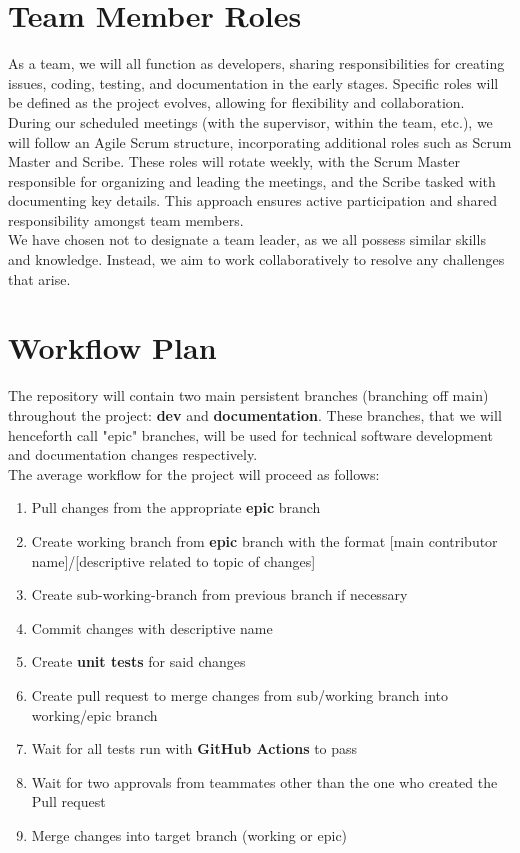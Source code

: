 \documentclass{article}
\begin{document}
\section{Team Member Roles}

\hspace{\parindent}As a team, we will all function as developers,
sharing responsibilities
for creating issues, coding, testing, and documentation in the early
stages. Specific roles
will be defined as the project evolves, allowing for flexibility and
collaboration. \\

During our scheduled meetings (with the supervisor, within the team,
etc.), we will follow
an Agile Scrum structure, incorporating additional roles such as
Scrum Master and Scribe.
These roles will rotate weekly, with the Scrum Master responsible for
organizing and leading
the meetings, and the Scribe tasked with documenting key details.
This approach ensures active
participation and shared responsibility amongst team members. \\

We have chosen not to designate a team leader, as we all possess
similar skills and knowledge.
Instead, we aim to work collaboratively to resolve any challenges that arise.

\section{Workflow Plan}

\hspace{\parindent}The repository will contain two main persistent
branches (branching off main) throughout the project:
\textbf{dev} and \textbf{documentation}. These branches, that we will
henceforth call "epic" branches, will be used for technical
software development and documentation changes respectively. \\

The average workflow for the project will proceed as follows:
\begin{enumerate}
  \item Pull changes from the appropriate \textbf{epic} branch
  \item Create working branch from \textbf{epic} branch with the
    format [main contributor name]/[descriptive related to topic of changes]
  \item Create sub-working-branch from previous branch if necessary
  \item Commit changes with descriptive name
  \item Create \textbf{unit tests} for said changes
  \item Create pull request to merge changes from sub/working branch
    into working/epic branch
  \item Wait for all tests run with \textbf{GitHub Actions} to pass
  \item Wait for two approvals from teammates other than the one who
    created the Pull request
  \item Merge changes into target branch (working or epic)
\end{enumerate}
\end{document}
